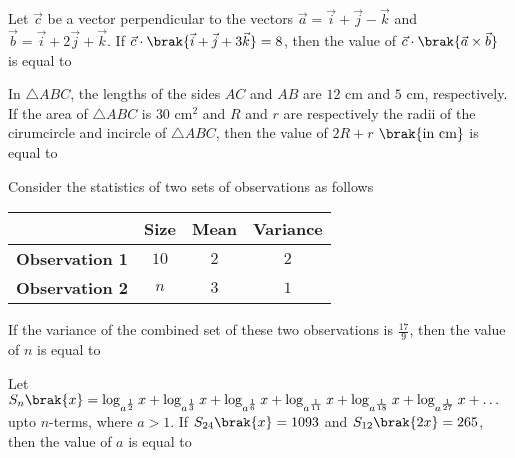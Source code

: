 \iffalse
    \title{2021}
    \author{EE24BTECH11002}
    \section{integer}
\fi

    \item Let $\vec{c}$ be a vector perpendicular to the vectors $\vec{a} = \vec{i} + \vec{j} - \vec{k}$ and $\vec{b} = \vec{i} + 2\vec{j} + \vec{k}$. If $\vec{c} \cdot \brak{\vec{i} + \vec{j} + 3\vec{k}} = 8$, then the value of $\vec{c} \cdot \brak{\vec{a}\times\vec{b}}$ is equal to
    \hfill{}

    \item In $\triangle ABC$, the lengths of the sides $AC$ and $AB$ are $12$ cm and $5$ cm, respectively. If the area of $\triangle ABC$ is $30$ $\text{cm}^2$ and $R$ and $r$ are respectively the radii of the cirumcircle and incircle of $\triangle ABC$, then the value of $2R + r$ $\brak{\text{in cm}}$ is equal to
    \hfill{}

    \item Consider the statistics of two sets of observations as follows
    
	\begin{table}[h!]
		\centering
        \begin{tabular}[12pt]{ |c| c| c| c|}
            \hline
            & \textbf{Size} & \textbf{Mean} & \textbf{Variance}\\
            \hline
            \textbf{Observation 1} & $10$ & $2$ & $2$\\
            \hline
            \textbf{Observation 2} & $n$ & $3$ & $1$\\
            \hline
        \end{tabular}
		\label{table.q23}
	\end{table}

	If the variance of the combined set of these two observations is $\frac{17}{9}$, then the value of $n$ is equal to
    \hfill{}

    \item Let $S_n\brak{x} = \log_{a^{\frac{1}{2}}} x + \log_{a^{\frac{1}{3}}} x + \log_{a^{\frac{1}{6}}} x + \log_{a^{\frac{1}{11}}} x + \log_{a^{\frac{1}{18}}} x + \log_{a^{\frac{1}{27}}} x + \dots$ upto $n$-terms, where $a>1$. If $S_{24}\brak{x} = 1093$ and $S_{12}\brak{2x} = 265$, then the value of $a$ is equal to
    \hfill{}

